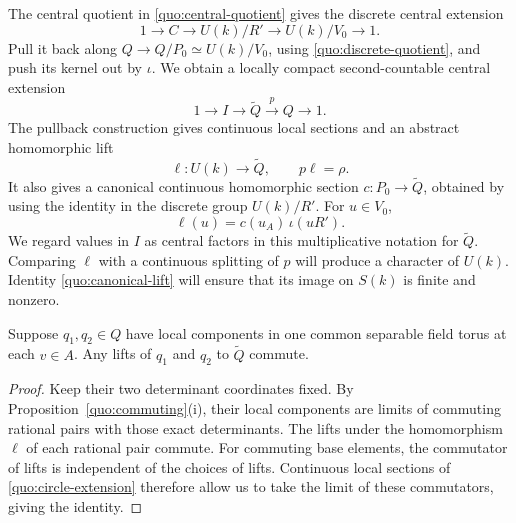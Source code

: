 The central quotient in \eqref{quo:central-quotient} gives the discrete
central extension
\[
 1\longrightarrow C\longrightarrow U(k)/R'
   \longrightarrow U(k)/V_0\longrightarrow1.
\]
Pull it back along
$Q\to Q/P_0\simeq U(k)/V_0$, using \eqref{quo:discrete-quotient},
and push its kernel out by $\iota$.  We obtain a locally compact second-countable central
extension
\begin{equation}\label{quo:circle-extension}
 1\longrightarrow I\longrightarrow\widetilde Q
   \xrightarrow{p}Q\longrightarrow1.
\end{equation}
The pullback construction gives continuous local sections and an
abstract homomorphic lift
\[
 \ell:U(k)\longrightarrow\widetilde Q,
 \qquad p\ell=\rho.
\]
It also gives a canonical continuous homomorphic section
$c:P_0\to\widetilde Q$, obtained by using the identity in the
discrete group $U(k)/R'$.  For $u\in V_0$,
\begin{equation}\label{quo:canonical-lift}
 \ell(u)=c(u_A)\,\iota(uR').
\end{equation}
We regard values in $I$ as central factors in this multiplicative
notation for $\widetilde Q$.  Comparing $\ell$ with a continuous
splitting of $p$ will produce a character of $U(k)$.  Identity
\eqref{quo:canonical-lift} will ensure that its image on $S(k)$ is
finite and nonzero.

\begin{lemma}\label{quo:commuting-lifts}
Suppose $q_1,q_2\in Q$ have local components in one common separable
field torus at each $v\in A$.  Any lifts of $q_1$ and $q_2$ to
$\widetilde Q$ commute.
\end{lemma}

\begin{proof}
Keep their two determinant coordinates fixed.  By
Proposition~\ref{quo:commuting}(i), their local components are limits
of commuting rational pairs with those exact determinants.  The
lifts under the homomorphism $\ell$ of each rational pair commute.
For commuting base elements, the commutator of lifts is independent
of the choices of lifts.  Continuous local sections of
\eqref{quo:circle-extension} therefore allow us to take the limit
of these commutators, giving the identity.
\end{proof}

